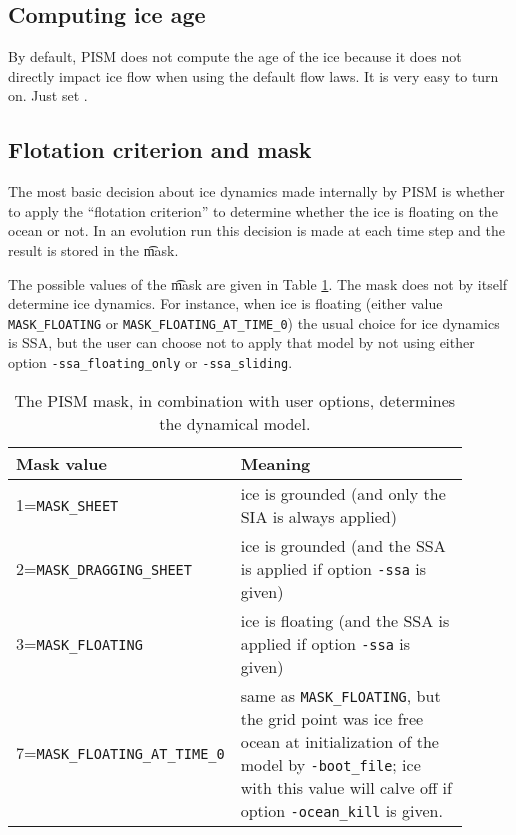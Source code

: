 \subsection{Computing ice age} \label{subsect:age}

By default, PISM does not compute the age of the ice because it does not directly impact ice flow when using the default flow laws. It is very easy to turn on.  Just set .

  
\subsection{Flotation criterion and mask} \label{subsect:floatmask}  The most basic decision about ice dynamics made internally by PISM is whether to apply the ``flotation criterion'' to determine whether the ice is floating on the ocean or not.  In an evolution run this decision is made at each time step and the result is stored in the \t{mask}.

The possible values of the \t{mask} are given in Table \ref{tab:maskvals}.  The mask does not by itself determine ice dynamics.  For instance, when ice is floating (either value \texttt{MASK_FLOATING} or \texttt{MASK_FLOATING_AT_TIME_0}) the usual choice for ice dynamics is SSA, but the user can choose not to apply that model by not using either option \texttt{-ssa_floating_only} or \texttt{-ssa_sliding}.

\begin{table}[ht]
\centering
\caption{The PISM mask, in combination with user options, determines the dynamical model.}\label{tab:maskvals} 
\small
\begin{tabular}{p{0.25\linewidth}p{0.65\linewidth}}
\\\toprule
\textbf{Mask value} & \textbf{Meaning}\\\midrule
1=\texttt{MASK_SHEET} & ice is grounded (and only the SIA is always applied) \\
2=\texttt{MASK_DRAGGING_SHEET} & ice is grounded (and the SSA is applied if option \texttt{-ssa} is given) \\
3=\texttt{MASK_FLOATING} & ice is floating (and the SSA is applied if option \texttt{-ssa} is given) \\
7=\texttt{MASK_FLOATING_AT_TIME_0} & same as \texttt{MASK_FLOATING}, but the grid point was ice free ocean at initialization of the model by \texttt{-boot_file}; ice with this value will calve off if option \texttt{-ocean_kill} is given.
\\\bottomrule
\end{tabular}
\normalsize
\end{table}

